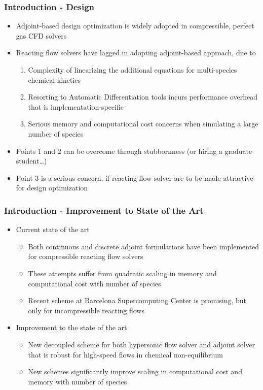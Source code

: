 \documentclass{beamer}
\begin{document}
\begin{frame}
  \frametitle{Introduction - Design}
  \begin{itemize}
    \item Adjoint-based design optimization is widely adopted in compressible,
      perfect gas CFD solvers
    \item Reacting flow solvers have lagged in adopting adjoint-based approach,
      due to
    \begin{enumerate}
      \item Complexity of linearizing the additional equations for
        multi-species chemical kinetics
      \item Resorting to Automatic Differentiation tools incurs performance
        overhead that is implementation-specific
      \item Serious memory and computational cost concerns when simulating a
        large number of species
    \end{enumerate}
    \item Points 1 and 2 can be overcome through stubbornness (or hiring a
      graduate student\dots)
    \item Point 3 is a serious concern, if reacting flow solver are to be made
      attractive for design optimization
  \end{itemize}
\end{frame}
\begin{frame}
  \frametitle{Introduction - Improvement to State of the Art}
  \begin{itemize}
    \item Current state of the art
      \begin{itemize}
        \item Both continuous and
          discrete adjoint formulations
          have been implemented for compressible reacting flow solvers
        \item These attempts suffer from quadratic scaling in memory and
          computational cost with number of species
        \item Recent scheme at Barcelona Supercomputing
          Center is promising, but only for
          incompressible reacting flows
      \end{itemize}
    \item Improvement to the state of the art
      \begin{itemize}
        \item New decoupled scheme for both hypersonic flow solver and adjoint
          solver that is robust for high-speed flows in chemical non-equilibrium
        \item New schemes significantly improve scaling in computational cost
          and memory with number of species
      \end{itemize}
  \end{itemize}
\end{frame}
\end{document}
